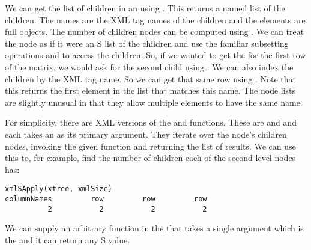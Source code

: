 We can get the list of children in an  using
.  This returns a named list of the children.
The names are the XML tag names of the children and the elements are
full  objects.  The number of children nodes can be
computed using .
We can treat the node as if it were an S list of the children and 
use the familiar
subsetting operations \SFunction{[} and \SFunction{[[} to access the
children.  So, if we wanted to get the  for the first
row of the matrix, we would ask for the second child using
.  We can also index the children by the XML
tag name. So we can get that same row using
.  Note that this returns the first
element in the list that matches this name.  The node lists are
slightly unusual in that they allow multiple elements to have the same
name. 


For simplicity, there are XML versions of the  and
 functions. These are  and
 and each takes an  as its
primary argument.  They iterate over the node's children nodes,
invoking the given function and returning the list of results.  We can
use this to, for example, find the number of children each of the
second-level nodes has:
\begin{verbatim}
xmlSApply(xtree, xmlSize)
columnNames         row         row         row 
          2           2           2           2 
\end{verbatim}
We can supply an arbitrary function in the  that
takes a single argument which is the  and it can
return any S value.  


